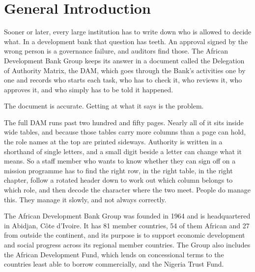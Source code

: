 
\chapter*{General Introduction}


Sooner or later, every large institution has to write down who is allowed to
decide what. In a development bank that question has teeth. An approval signed
by the wrong person is a governance failure, and auditors find those. The
African Development Bank Group keeps its answer in a document called the
Delegation of Authority Matrix, the DAM, which goes through the Bank's
activities one by one and records who starts each task, who has to check it, who
reviews it, who approves it, and who simply has to be told it happened.

The document is accurate. Getting at what it says is the problem.

The full DAM runs past two hundred and fifty pages. Nearly all of it sits inside
wide tables, and because those tables carry more columns than a page can hold,
the role names at the top are printed sideways. Authority is written in a
shorthand of single letters, and a small digit beside a letter can change what
it means. So a staff member who wants to know whether they can sign off on a
mission programme has to find the right row, in the right table, in the right
chapter, follow a rotated header down to work out which column belongs to which
role, and then decode the character where the two meet. People do manage this.
They manage it slowly, and not always correctly.


The African Development Bank Group was founded in 1964 and is headquartered in
Abidjan, C\^ote d'Ivoire. It has 81 member countries, 54 of them African and 27
from outside the continent, and its purpose is to support economic development
and social progress across its regional member countries. The Group also
includes the African Development Fund, which lends on concessional terms to the
countries least able to borrow commercially, and the Nigeria Trust Fund.

